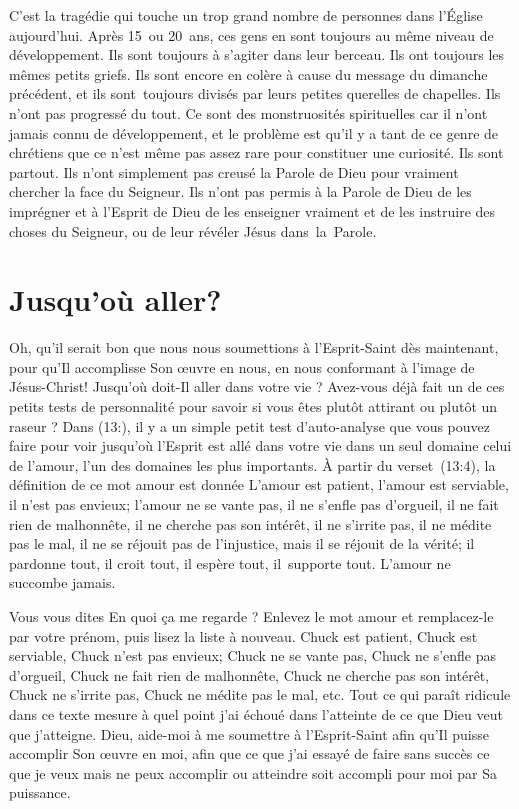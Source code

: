 C'est la tragédie qui touche un trop grand nombre de personnes
 dans l'Église aujourd'hui. Après 15~ou 20~ans,
 ces gens en sont toujours au même niveau de développement.
 Ils sont toujours à s'agiter dans leur berceau.
 Ils ont toujours les mêmes petits griefs.
 Ils sont encore en colère à cause du message du dimanche précédent,
 et ils sont~toujours divisés par leurs petites querelles de chapelles.
 Ils n'ont pas progressé du tout. Ce sont des monstruosités spirituelles
 car il n'ont jamais connu de développement, et le problème est qu'il y a
 tant de ce genre de chrétiens que ce n'est même pas assez rare pour constituer une curiosité.
 Ils sont partout. Ils n'ont simplement pas creusé la Parole de Dieu
 pour vraiment chercher la face du Seigneur. Ils n'ont pas permis à la Parole de Dieu
 de les imprégner et à l'Esprit de Dieu de les enseigner vraiment et
 de les instruire des choses du Seigneur,
 ou de leur révéler Jésus dans~la~Parole.


\section{Jusqu'o\`u aller?}

Oh, qu'il serait bon que nous nous soumettions à l'Esprit-Saint
 dès maintenant, pour qu'Il accomplisse Son œuvre en nous,
 en nous conformant à l'image de Jésus-Christ!
 Jusqu'où doit-Il aller dans votre vie ?
 Avez-vous déjà fait un de ces petits tests de personnalité pour savoir
 si vous êtes plutôt attirant ou plutôt un raseur ?
 Dans (13:), il y a un simple petit test d'auto-analyse
 que vous pouvez faire pour voir jusqu'où l'Esprit est allé
 dans votre vie dans un seul domaine\frcolon{} celui de l'amour,
 l'un des domaines les plus importants.
 À partir du verset~(13:4), la définition
 de ce mot \Og amour \Fg{} est donnée\frcolon{}
 \Og L'amour est patient, l'amour est serviable, il n'est pas envieux;
 l'amour ne se vante pas, il ne s'enfle pas d'orgueil,
 il ne fait rien de malhonnête, il ne cherche pas son intérêt,
 il ne s'irrite pas, il ne médite pas le mal, il ne se réjouit pas
 de l'injustice, mais il se réjouit de la vérité; il pardonne tout,
 il croit tout, il espère tout, il~supporte tout.
 L'amour ne succombe jamais. \Fg{}

Vous vous dites\frcolon{}
 \Og En quoi ça me regarde ? \Fg{}
 Enlevez le mot \Og amour \Fg{} et remplacez-le par votre prénom,
 puis lisez la liste à nouveau.
 \Og Chuck est patient, Chuck est serviable, Chuck n'est pas envieux;
 Chuck ne se vante pas, Chuck ne s'enfle pas d'orgueil, Chuck ne fait rien
 de malhonnête, Chuck ne cherche pas son intérêt, Chuck ne s'irrite pas,
 Chuck ne médite pas le mal, etc. \Fg{}
 Tout ce qui paraît ridicule dans ce texte mesure à quel point j'ai échoué
 dans l'atteinte de ce que Dieu veut que j'atteigne.
 Dieu, aide-moi à me soumettre à l'Esprit-Saint afin qu'Il puisse accomplir
 Son œuvre en moi, afin que ce que j'ai essayé de faire sans succès
 \ocadr ce que je veux mais ne peux accomplir ou atteindre \fcadr
 soit accompli pour moi par Sa puissance.
\closechapter
